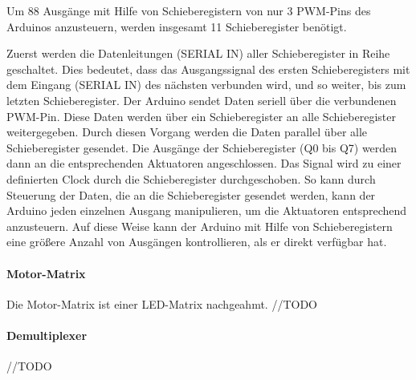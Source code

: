 Um 88 Ausgänge mit Hilfe von Schieberegistern von nur 3 PWM-Pins des Arduinos anzusteuern, werden insgesamt 11
Schieberegister benötigt.\newline

Zuerst werden die Datenleitungen (SERIAL IN) aller Schieberegister in Reihe geschaltet. Dies bedeutet, dass das
Ausgangssignal des ersten Schieberegisters mit dem Eingang (SERIAL IN) des nächsten verbunden wird, und so weiter, bis
zum letzten Schieberegister. \newline
Der Arduino sendet Daten seriell über die verbundenen PWM-Pin. Diese Daten werden über ein Schieberegister an
alle Schieberegister weitergegeben. Durch diesen Vorgang werden die Daten parallel über alle Schieberegister gesendet.
\newline
Die Ausgänge der Schieberegister (Q0 bis Q7) werden dann an die entsprechenden Aktuatoren angeschlossen.
Das Signal wird zu einer definierten Clock durch die Schieberegister durchgeschoben. So kann durch Steuerung der Daten,
die an die Schieberegister gesendet werden, kann der Arduino jeden einzelnen Ausgang manipulieren, um die Aktuatoren
entsprechend anzusteuern. \newline
Auf diese Weise kann der Arduino mit Hilfe von Schieberegistern eine größere Anzahl von Ausgängen kontrollieren, als er
direkt verfügbar hat.
\paragraph{Motor-Matrix}
Die Motor-Matrix ist einer LED-Matrix nachgeahmt.
//TODO
\paragraph{Demultiplexer}
//TODO


